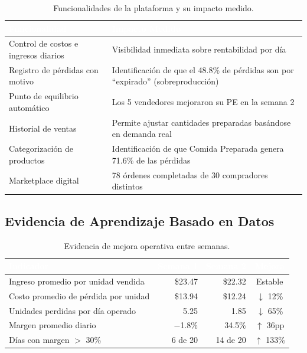 \documentclass[12pt,letterpaper]{article}
\begin{document}
\begin{table}[H]
\centering
{}
\begin{tabular}{p{5cm} p{8cm}}
\toprule
\rowcolor{tabheader}
\textcolor{white}{\textbf{Funcionalidad}} &
\textcolor{white}{\textbf{Impacto Medido}} \\
\midrule
Control de costos e ingresos diarios & Visibilidad inmediata sobre rentabilidad por día \\
Registro de pérdidas con motivo & Identificación de que el 48.8\% de pérdidas son por ``expirado'' (sobreproducción) \\
Punto de equilibrio automático & Los 5 vendedores mejoraron su PE en la semana 2 \\
Historial de ventas & Permite ajustar cantidades preparadas basándose en demanda real \\
Categorización de productos & Identificación de que Comida Preparada genera 71.6\% de las pérdidas \\
Marketplace digital & 78 órdenes completadas de 30 compradores distintos \\
\bottomrule
\end{tabular}
\caption{Funcionalidades de la plataforma y su impacto medido.}
\end{table}

\subsection{Evidencia de Aprendizaje Basado en Datos}

\begin{table}[H]
\centering
\footnotesize
{}
\begin{tabular}{l r r c}
\toprule
\rowcolor{tabheader}
\textcolor{white}{\textbf{Indicador}} &
\textcolor{white}{\textbf{Semana 1}} &
\textcolor{white}{\textbf{Semana 2}} &
\textcolor{white}{\textbf{Mejora}} \\
\midrule
Ingreso promedio por unidad vendida   & \$23.47 & \$22.32 & Estable \\
Costo promedio de pérdida por unidad  & \$13.94 & \$12.24 & \textcolor{success}{$\downarrow$ 12\%} \\
Unidades perdidas por día operado     & 5.25    & 1.85    & \textcolor{success}{$\downarrow$ 65\%} \\
Margen promedio diario                & $-$1.8\% & 34.5\%  & \textcolor{success}{$\uparrow$ 36pp} \\
Días con margen $>$ 30\%              & 6 de 20 & 14 de 20 & \textcolor{success}{$\uparrow$ 133\%} \\
\bottomrule
\end{tabular}
\caption{Evidencia de mejora operativa entre semanas.}
\end{table}
\end{document}
